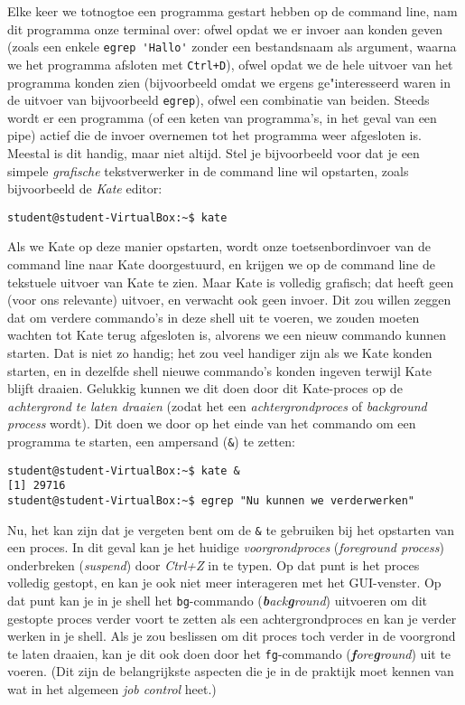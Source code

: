 \documentclass[a4paper,twoside,openany]{memoir}
\begin{document}
Elke keer we totnogtoe een programma gestart hebben op de command line, nam dit
programma onze terminal over: ofwel opdat we er invoer aan konden geven (zoals
een enkele \verb!egrep 'Hallo'! zonder een bestandsnaam als argument, waarna we
het programma afsloten met \verb!Ctrl+D!), ofwel opdat we de hele uitvoer van
het programma konden zien (bijvoorbeeld omdat we ergens ge"interesseerd waren
in de uitvoer van bijvoorbeeld \verb!egrep!), ofwel een combinatie van beiden.
Steeds wordt er een programma (of een keten van programma's, in het geval van
een pipe) actief die de invoer overnemen tot het programma weer afgesloten is.
Meestal is dit handig, maar niet altijd. Stel je bijvoorbeeld voor dat je een
simpele \emph{grafische} tekstverwerker in de command line wil opstarten, zoals
bijvoorbeeld de \emph{Kate} editor:
\begin{verbatim}
student@student-VirtualBox:~$ kate
\end{verbatim}

Als we Kate op deze manier opstarten, wordt onze toetsenbordinvoer van de
command line naar Kate doorgestuurd, en krijgen we op de command line de
tekstuele uitvoer van Kate te zien. Maar Kate is volledig grafisch; dat heeft
geen (voor ons relevante) uitvoer, en verwacht ook geen invoer. Dit zou willen
zeggen dat om verdere commando's in deze shell uit te voeren, we zouden moeten
wachten tot Kate terug afgesloten is, alvorens we een nieuw commando kunnen
starten. Dat is niet zo handig; het zou veel handiger zijn als we Kate konden
starten, en in dezelfde shell nieuwe commando's konden ingeven terwijl Kate
blijft draaien. Gelukkig kunnen we dit doen door dit Kate-proces op de
\emph{achtergrond te laten draaien} (zodat het een \emph{achtergrondproces} of
\emph{background process} wordt). Dit doen we door op het einde van het
commando om een programma te starten, een ampersand (\verb!&!) te zetten:

\begin{verbatim}
student@student-VirtualBox:~$ kate &
[1] 29716
student@student-VirtualBox:~$ egrep "Nu kunnen we verderwerken"
\end{verbatim}

Nu, het kan zijn dat je vergeten bent om de \verb!&! te gebruiken bij het
opstarten van een proces. In dit geval kan je het huidige
\emph{voorgrondproces} (\emph{foreground process}) onderbreken (\emph{suspend})
door \emph{Ctrl+Z} in te typen. Op dat punt is het proces volledig gestopt, en
kan je ook niet meer interageren met het GUI-venster. Op dat punt kan je in je
shell het \verb!bg!-commando (\emph{\textbf{b}ack\textbf{g}round}) uitvoeren om
dit gestopte proces verder voort te zetten als een achtergrondproces en kan je
verder werken in je shell. Als je zou beslissen om dit proces toch verder in de
voorgrond te laten draaien, kan je dit ook doen door het \verb!fg!-commando
(\emph{\textbf{f}ore\textbf{g}round}) uit te voeren. (Dit zijn de belangrijkste
aspecten die je in de praktijk moet kennen van wat in het algemeen \emph{job
control} heet.)
\end{document}
